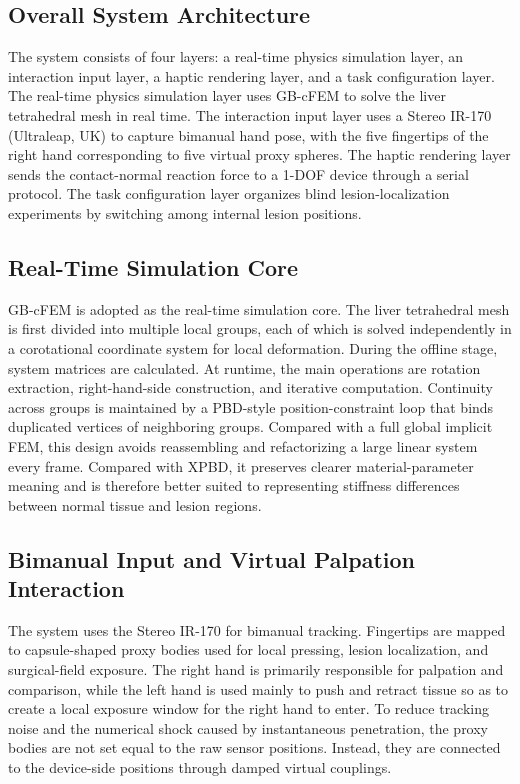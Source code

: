 \documentclass{ieeeaccess}
\begin{document}
\subsection{Overall System Architecture}
The system consists of four layers: a real-time physics simulation layer, an interaction input layer, a haptic rendering layer, and a task configuration layer. The real-time physics simulation layer uses GB-cFEM to solve the liver tetrahedral mesh in real time. The interaction input layer uses a Stereo IR-170 (Ultraleap, UK) to capture bimanual hand pose, with the five fingertips of the right hand corresponding to five virtual proxy spheres. The haptic rendering layer sends the contact-normal reaction force to a 1-DOF device through a serial protocol. The task configuration layer organizes blind lesion-localization experiments by switching among internal lesion positions.

\subsection{Real-Time Simulation Core}
GB-cFEM is adopted as the real-time simulation core. The liver tetrahedral mesh is first divided into multiple local groups, each of which is solved independently in a corotational coordinate system for local deformation. During the offline stage, system matrices are calculated. At runtime, the main operations are rotation extraction, right-hand-side construction, and iterative computation. Continuity across groups is maintained by a PBD-style position-constraint loop that binds duplicated vertices of neighboring groups. Compared with a full global implicit FEM, this design avoids reassembling and refactorizing a large linear system every frame. Compared with XPBD, it preserves clearer material-parameter meaning and is therefore better suited to representing stiffness differences between normal tissue and lesion regions.

\subsection{Bimanual Input and Virtual Palpation Interaction}
The system uses the Stereo IR-170 for bimanual tracking. Fingertips are mapped to capsule-shaped proxy bodies used for local pressing, lesion localization, and surgical-field exposure. The right hand is primarily responsible for palpation and comparison, while the left hand is used mainly to push and retract tissue so as to create a local exposure window for the right hand to enter. To reduce tracking noise and the numerical shock caused by instantaneous penetration, the proxy bodies are not set equal to the raw sensor positions. Instead, they are connected to the device-side positions through damped virtual couplings.
\end{document}
